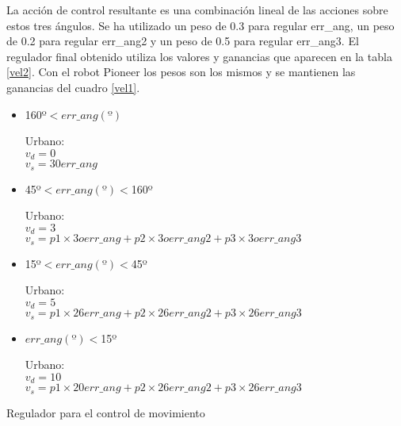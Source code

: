 La acción de control resultante es una combinación lineal de las acciones sobre estos tres ángulos. Se ha utilizado un peso de 0.3 para regular err\_ang, un peso de 0.2 para regular err\_ang2 y un peso de 0.5 para regular err\_ang3. El regulador final obtenido utiliza los valores y ganancias que aparecen en la tabla \ref{vel2}. Con el robot Pioneer los pesos son los mismos y se mantienen las ganancias del cuadro \ref{vel1}.
\begin{table} \label{vel2}
\begin{itemize}

  \item 160º$<err\_ang(º)$

        \begin{tabbing}
        Urbano:\\
        $v_{d}=0$ \\
        $v_{s}=30err\_ang$
        \end{tabbing}


  \item 45º$<err\_ang(º)<$160º

        \begin{tabbing}
        Urbano:\\
        $v_{d}=3$ \\
        $v_{s}=p1\times3oerr\_ang + p2\times3oerr\_ang2 + p3\times3oerr\_ang3$
        \end{tabbing}

  \item 15º$<err\_ang(º)<$45º

        \begin{tabbing}
        Urbano:\\
        $v_{d}=5$ \\
        $v_{s}=p1\times26err\_ang + p2\times26err\_ang2 + p3\times26err\_ang3$
        \end{tabbing}

  \item $err\_ang(º)<$15º

        \begin{tabbing}
        Urbano: \\
        $v_{d}=10$\\
        $v_{s}=p1\times20err\_ang + p2\times26err\_ang2 + p3\times26err\_ang3$
        \end{tabbing}
\end{itemize}

\caption{Regulador para el control de movimiento}
\end{table}

